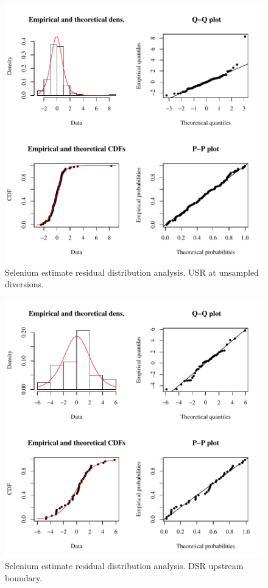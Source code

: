 \begin{figure}[htbp]
	\begin{center}
	\includegraphics[width=6in]{"Figures/Results_USR/Conc Model res-fit UDIV"}
	\caption{Selenium estimate residual distribution analysis.  USR at unsampled diversions.}
	\end{center}
\end{figure}
\newpage

\begin{figure}[htbp]
	\begin{center}
	\includegraphics[width=6in]{"Figures/Results_DSR/Conc Model res-fit D101C"}
	\caption{Selenium estimate residual distribution analysis.  DSR upstream boundary.}
	\end{center}
\end{figure}
\newpage

